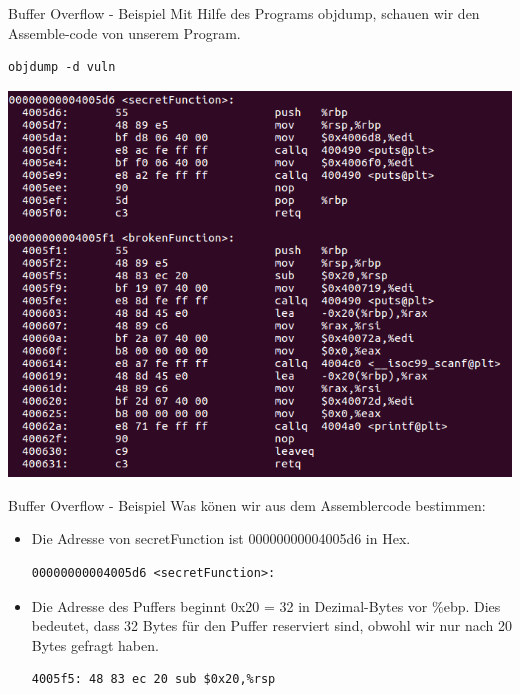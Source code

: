 \documentclass[10pt]{beamer}
\begin{document}
\begin{frame}[fragile]{Buffer Overflow - Beispiel}
  Mit Hilfe des Programs objdump, schauen wir den Assemble-code von unserem Program.

  \begin{lstlisting}[style=C2Style]
    objdump -d vuln
  \end{lstlisting}

  \includegraphics[width=\textwidth]{buffer-1.png}
\end{frame}

\begin{frame}[fragile]{Buffer Overflow - Beispiel}
  Was k\"onen wir aus dem Assemblercode bestimmen:

  \begin{itemize}
    \item Die Adresse von secretFunction ist 00000000004005d6 in Hex. 
    \begin{lstlisting}[style=C2Style]
      00000000004005d6 <secretFunction>:
    \end{lstlisting}
    \item Die Adresse des Puffers beginnt 0x20 = 32 in Dezimal-Bytes vor \%ebp. Dies bedeutet, dass 32 Bytes f\"ur den Puffer reserviert sind, obwohl wir nur nach 20 Bytes gefragt haben.
    \begin{lstlisting}[style=C2Style]
      4005f5: 48 83 ec 20 sub $0x20,%rsp
    \end{lstlisting}
  \end{itemize}

\end{frame}
\end{document}
